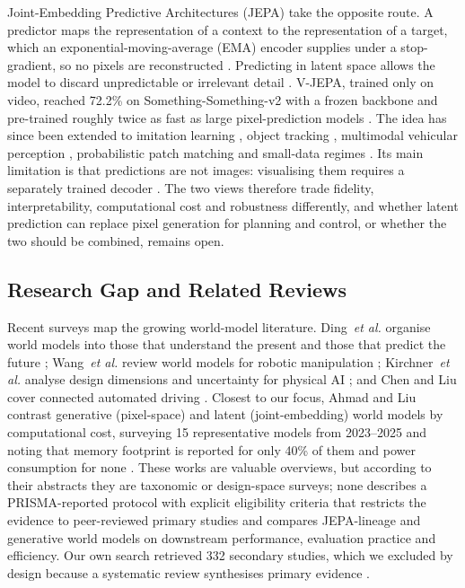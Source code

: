 \documentclass[conference,a4paper]{IEEEtran}
\begin{document}
Joint-Embedding Predictive Architectures (JEPA) take the opposite route. A predictor maps the representation of a context to the representation of a target, which an exponential-moving-average (EMA) encoder supplies under a stop-gradient, so no pixels are reconstructed \cite{bardes2024vjepa,assran2023ijepa}. Predicting in latent space allows the model to discard unpredictable or irrelevant detail \cite{bardes2024vjepa,vujinovic2026actjepa}. V-JEPA, trained only on video, reached 72.2\% on Something-Something-v2 with a frozen backbone and pre-trained roughly twice as fast as large pixel-prediction models \cite{bardes2024vjepa}. The idea has since been extended to imitation learning \cite{vujinovic2026actjepa}, object tracking \cite{chen2026gotjepa}, multimodal vehicular perception \cite{gupta2026lmjepa}, probabilistic patch matching \cite{gogos2026pijepa} and small-data regimes \cite{velez2026scott}. Its main limitation is that predictions are not images: visualising them requires a separately trained decoder \cite{bardes2024vjepa}. The two views therefore trade fidelity, interpretability, computational cost and robustness differently, and whether latent prediction can replace pixel generation for planning and control, or whether the two should be combined, remains open.

\subsection{Research Gap and Related Reviews}
Recent surveys map the growing world-model literature. Ding~\textit{et al.} organise world models into those that understand the present and those that predict the future \cite{ding2025survey}; Wang~\textit{et al.} review world models for robotic manipulation \cite{wang2026smartbot}; Kirchner~\textit{et al.} analyse design dimensions and uncertainty for physical AI \cite{kirchner2026survey}; and Chen and Liu cover connected automated driving \cite{chen2025cav}. Closest to our focus, Ahmad and Liu contrast generative (pixel-space) and latent (joint-embedding) world models by computational cost, surveying 15 representative models from 2023--2025 and noting that memory footprint is reported for only 40\% of them and power consumption for none \cite{ahmad2026cost}. These works are valuable overviews, but according to their abstracts they are taxonomic or design-space surveys; none describes a PRISMA-reported protocol with explicit eligibility criteria that restricts the evidence to peer-reviewed primary studies and compares JEPA-lineage and generative world models on downstream performance, evaluation practice and efficiency. Our own search retrieved 332 secondary studies, which we excluded by design because a systematic review synthesises primary evidence \cite{kitchenham2007guidelines}.
\end{document}
